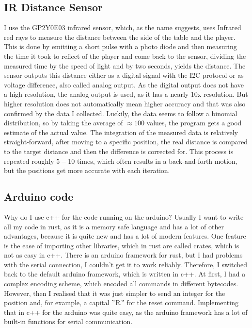 \subsection{IR Distance Sensor}\label{subsec:ir-distance-sensor}
I use the GP2Y0E03\autocite{ir-sensor} infrared sensor, which, as the name suggests, uses Infrared red rays to measure the distance between the side of the table and the player.
This is done by emitting a short pulse with a photo diode and then measuring the time it took to reflect of the player and come back to the sensor, dividing the measured time by the speed of light and by two seconds, yields the distance.
The sensor outputs this distance either as a digital signal with the I2C protocol or as voltage difference, also called analog output.
As the digital output does not have a high resolution, the analog output is used, as it has a nearly 10x resolution.
But higher resolution does not automatically mean higher accuracy and that was also confirmed by the data I collected.
Luckily, the data seems to follow a binomial distribution, so by taking the average of $\approx100$ values, the program gets a good estimate of the actual value.
The integration of the measured data is relatively straight-forward, after moving to a specific position, the real distance is compared to the target distance and then the difference is corrected for.
This process is repeated roughly $5-10$ times, which often results in a back-and-forth motion, but the positions get more accurate with each iteration.

\subsection{Arduino code}\label{subsec:arduino-code}
Why do I use c++ for the code running on the arduino?
Usually I want to write all my code in rust, as it is a memory safe language and has a lot of other advantages, because it is quite new and has a lot of modern features.
One feature is the ease of importing other libraries, which in rust are called crates, which is not as easy in c++.
There is an arduino framework for rust, but I had problems with the serial connection, I couldn't get it to work reliably.
Therefore, I switched back to the default arduino framework, which is written in c++.
At first, I had a complex encoding scheme, which encoded all commands in different bytecodes.
However, then I realised that it was just simpler to send an integer for the position and, for example, a capital \("\)R\("\) for the reset command.
Implementing that in c++ for the arduino was quite easy, as the arduino framework has a lot of built-in functions for serial communication.